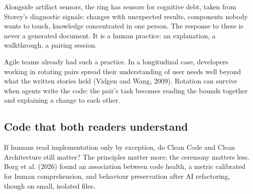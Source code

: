 \documentclass[11pt]{article}
\begin{document}
Alongside artifact sensors, the ring has sensors for cognitive debt, taken from Storey's diagnostic signals: changes with unexpected results, components nobody wants to touch, knowledge concentrated in one person. The response to these is never a generated document. It is a human practice: an explanation, a walkthrough, a pairing session.

Agile teams already had such a practice. In a longitudinal case, developers working in rotating pairs spread their understanding of user needs well beyond what the written stories held (Vidgen and Wang, 2009). Rotation can survive when agents write the code: the pair's task becomes reading the bounds together and explaining a change to each other.

\subsection{Code that both readers understand}

If humans read implementation only by exception, do Clean Code and Clean Architecture still matter? The principles matter more; the ceremony matters less. Borg et al. (2026) found an association between code health, a metric calibrated for human comprehension, and behaviour preservation after AI refactoring, though on small, isolated files.
\end{document}
